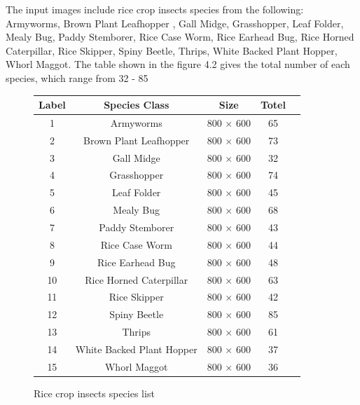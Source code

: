  The input images include rice crop insects species from the following: Armyworms, Brown Plant Leafhopper , Gall Midge, Grasshopper, Leaf Folder, Mealy Bug, Paddy Stemborer, Rice Case Worm, Rice Earhead Bug, Rice Horned Caterpillar, Rice Skipper, Spiny Beetle, Thrips, White Backed Plant Hopper, Whorl Maggot. The table shown in the figure 4.2 gives the total number of each species, which range from 32 - 85
 
 \renewcommand{\arraystretch}{1.5}
 \begin{figure}[!ht]
	\centering
	\begin{tabular}{|c|c|c|c|c|}
		\hline
		Label& Species Class & Size & Totel\\ \hline
		1&Armyworms& 800 $\times$ 600 & 65 \\  \hline
		2 &Brown Plant Leafhopper & 800 $\times$ 600& 73\\  \hline
		3 &Gall Midge & 800 $\times$ 600& 32 \\  \hline
		4 &Grasshopper & 800 $\times$ 600& 74 \\  \hline
		5 &Leaf Folder & 800 $\times$ 600& 45\\  \hline
		6 &Mealy Bug & 800 $\times$ 600& 68\\ \hline
		7 &Paddy Stemborer& 800 $\times$ 600& 43 \\ \hline
		8 & Rice Case Worm & 800 $\times$ 600& 44\\ \hline
		9 &Rice Earhead Bug & 800 $\times$ 600& 48\\ \hline
		10 &Rice Horned Caterpillar & 800 $\times$ 600& 63\\ \hline
		11 &Rice Skipper & 800 $\times$ 600& 42\\ \hline
		12 &Spiny Beetle & 800 $\times$ 600& 85\\ \hline
		13 & Thrips & 800 $\times$ 600& 61\\ \hline
		14 & White Backed Plant Hopper & 800 $\times$ 600& 37\\ \hline
		15 & Whorl Maggot & 800 $\times$ 600& 36\\ \hline
		
	\end{tabular}
	
	\caption{Rice crop insects species list}
	\label{fig:img9}
\end{figure}

